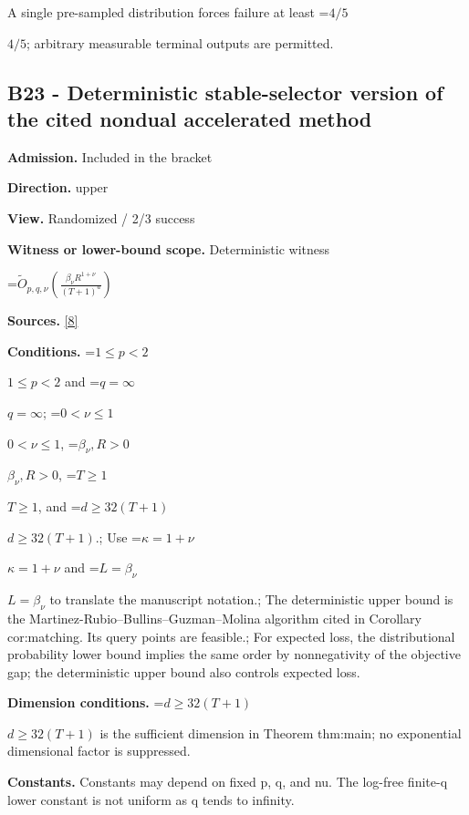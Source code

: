 \documentclass[10pt,a4paper]{article}
\newcommand{\AtlasMath}[1]{\par\begingroup\centering\setbox0=\hbox{$\displaystyle #1$}\ifdim\wd0>1.4\linewidth\typeout{ATLAS WIDE FORMULA: \the\wd0}\fi\ifdim\wd0>\linewidth\resizebox{\linewidth}{!}{\box0}\else\box0\fi\par\endgroup}
\newcommand{\AtlasInlineMath}[1]{\begingroup\setbox0=\hbox{$#1$}\ifdim\wd0>.4\linewidth\endgroup\AtlasMath{#1}\else\endgroup$#1$\fi}
\begin{document}
A single pre-sampled distribution forces failure at least \AtlasInlineMath{4/5}; arbitrary measurable terminal outputs are permitted.



\subsection{B23 - Deterministic stable-selector version of the cited nondual accelerated method}


\textbf{Admission.} Included in the bracket



\textbf{Direction.} upper



\textbf{View.} Randomized / 2/3 success



\textbf{Witness or lower-bound scope.} Deterministic witness



\AtlasMath{\widetilde O_{p,q,\nu}\!\left(\frac{\beta_\nu R^{1+\nu}}{(T+1)^a}\right)}


\textbf{Sources.} \href{https://github.com/WU-Wendao/Colombo/blob/main/colombo_sensorium/Complexity_altas/data/sources/colombo/B1/manuscript.pdf}{[8]}



\textbf{Conditions.} \AtlasInlineMath{1\le p<2} and \AtlasInlineMath{q=\infty}; \AtlasInlineMath{0<\nu\le1}, \AtlasInlineMath{\beta_\nu,R>0}, \AtlasInlineMath{T\ge1}, and \AtlasInlineMath{d\ge32(T+1)}.; Use \AtlasInlineMath{\kappa=1+\nu} and \AtlasInlineMath{L=\beta_\nu} to translate the manuscript notation.; The deterministic upper bound is the Martinez-Rubio--Bullins--Guzman--Molina algorithm cited in Corollary cor:matching. Its query points are feasible.; For expected loss, the distributional probability lower bound implies the same order by nonnegativity of the objective gap; the deterministic upper bound also controls expected loss.



\textbf{Dimension conditions.} \AtlasInlineMath{d\ge32(T+1)} is the sufficient dimension in Theorem thm:main; no exponential dimensional factor is suppressed.



\textbf{Constants.} Constants may depend on fixed p, q, and nu. The log-free finite-q lower constant is not uniform as q tends to infinity.
\end{document}
